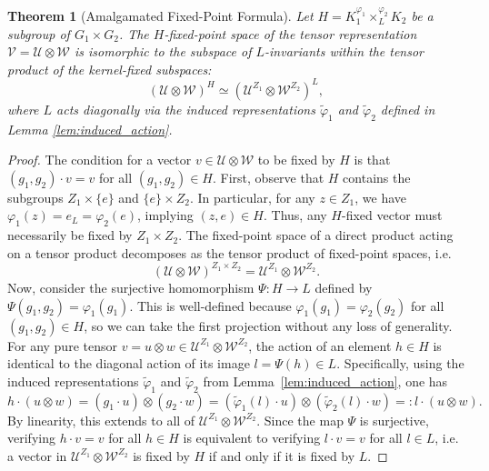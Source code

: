 \documentclass[twoside]{article}%
\newtheorem{theorem}{Theorem}[section]
\begin{document}
\begin{theorem}[Amalgamated Fixed-Point Formula] \label{thm:amalgamated_fp}Let $H = K_1^{\varphi_1} \times_L^{\varphi_2} K_2$ be a subgroup of $G_1 \times G_2$. The $H$-fixed-point space of the tensor representation $\mathcal{V} = \mathcal{U} \otimes \mathcal{W}$ is isomorphic to the subspace of $L$-invariants within the tensor product of the kernel-fixed subspaces:\begin{equation} \label{eq:fp_iso}(\mathcal{U} \otimes \mathcal{W})^H \simeq \left( \mathcal{U}^{Z_1} \otimes \mathcal{W}^{Z_2} \right)^L,\end{equation}where $L$ acts diagonally via the induced representations $\tilde{\varphi}_1$ and $\tilde{\varphi}_2$ defined in Lemma \ref{lem:induced_action}.\end{theorem}\begin{proof}The condition for a vector $v \in \mathcal{U} \otimes \mathcal{W}$ to be fixed by $H$ is that $(g_1, g_2) \cdot v = v$ for all $(g_1, g_2) \in H$. First, observe that $H$ contains the subgroups $Z_1 \times \{e\}$ and $\{e\} \times Z_2$. In particular, for any $z \in Z_1$, we have $\varphi_1(z) = e_L = \varphi_2(e)$, implying $(z, e) \in H$. Thus, any $H$-fixed vector must necessarily be fixed by $Z_1 \times Z_2$. The fixed-point space of a direct product acting on a tensor product decomposes as the tensor product of fixed-point spaces, i.e.
\[
(\mathcal{U} \otimes \mathcal{W})^{Z_1 \times Z_2} = \mathcal{U}^{Z_1} \otimes \mathcal{W}^{Z_2}.
\]
Now, consider the surjective homomorphism $\Psi: H \to L$ defined by $\Psi(g_1, g_2) = \varphi_1(g_1)$. This is well-defined because $\varphi_1(g_1) = \varphi_2(g_2)$ for all 
$(g_1, g_2) \in H$, so we can take the first projection without any loss of generality. 
For any pure tensor $v = u \otimes w \in \mathcal{U}^{Z_1} \otimes \mathcal{W}^{Z_2}$, the action of an element $h \in H$ is identical to the diagonal action of its image $l = \Psi(h) \in L$. Specifically, using the induced representations $\tilde{\varphi}_1$ and $\tilde{\varphi}_2$ from Lemma~\ref{lem:induced_action}, one has
\[
h \cdot (u \otimes w) = (g_1 \cdot u) \otimes (g_2 \cdot w) = (\tilde{\varphi}_1(l) \cdot u) \otimes (\tilde{\varphi}_2(l) \cdot w) =: l \cdot (u \otimes w).
\]
By linearity, this extends to all of $\mathcal{U}^{Z_1} \otimes \mathcal{W}^{Z_2}$. Since the map $\Psi$ is surjective, verifying $h \cdot v = v$ for all $h \in H$ is equivalent to verifying $l \cdot v = v$ for all $l \in L$, i.e. a vector in $\mathcal{U}^{Z_1} \otimes \mathcal{W}^{Z_2}$ is fixed by $H$ if and only if it is fixed by $L$.
\end{proof}
\end{document}
